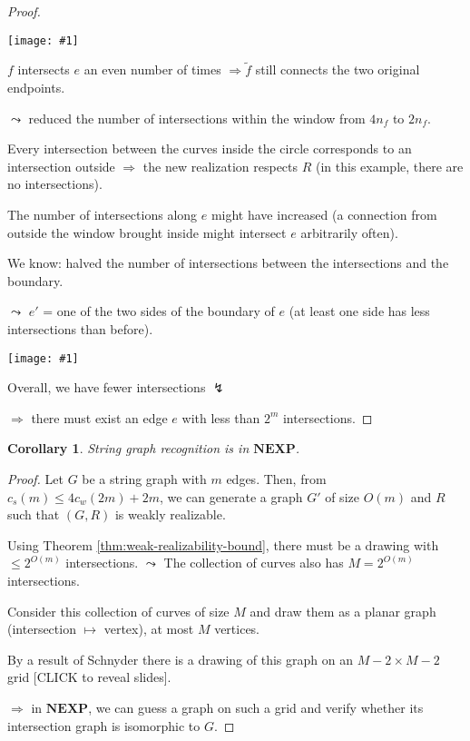 \documentclass[12pt]{article}
\theoremstyle{plain} %
\newtheorem{corollary}[theorem]{Corollary}
\newcommand{\image}[1]{\begin{center}\texttt{[image: \#1]}\end{center}}
\begin{document}
\begin{proof}
\image{images/figure-9.pdf}

\(f\) intersects \(e\) an even number of times \(\Rightarrow \tilde{f}\) still connects the two original endpoints.

\(\leadsto\) reduced the number of intersections within the window from \(4 n_f\) 
to \(2 n_f\).

Every intersection between the curves inside the circle corresponds to an intersection 
outside \(\Rightarrow\) the new realization respects \(R\) (in this example, there are no intersections).

The number of intersections along \(e\) might have increased (a connection from outside the window brought inside might intersect \(e\) arbitrarily often).

We know: halved the number of intersections between the intersections and the boundary. 

\(\leadsto\) \(e'\) = one of the two sides of the boundary of \(e\)
(at least one side has less intersections than before).

\image{images/figure-10.pdf}

Overall, we have fewer intersections \(\lightning\)

\(\Rightarrow\) there must exist an edge \(e\) with less than \(2^m\) intersections.
\end{proof}

\begin{corollary}
    String graph recognition is in \(\mathbf{NEXP}\).
\end{corollary}

\begin{proof}
Let \(G\) be a string graph with \(m\) edges.
Then, from \(c_s(m) \leq 4 c_w(2m) + 2m\), we can generate a graph \(G'\) of size \(O(m)\) and \(R\) such that
\((G, R)\) is weakly realizable.

Using Theorem \ref{thm:weak-realizability-bound}, there must be a drawing with \(\leq 2^{O(m)}\) intersections.
\(\leadsto\) The collection of curves also has \(M = 2^{O(m)}\) intersections.

Consider this collection of curves of size \(M\) and draw them as a planar graph (intersection \(\mapsto\) vertex), 
at most \(M\) vertices.

By a result of Schnyder there is a drawing of this graph on an \(M-2 \times M-2\) grid [CLICK to reveal slides].

\(\Rightarrow\) in \(\mathbf{NEXP}\), we can guess a graph on such a grid and verify whether its intersection graph is isomorphic to \(G\).
\end{proof}
\end{document}
